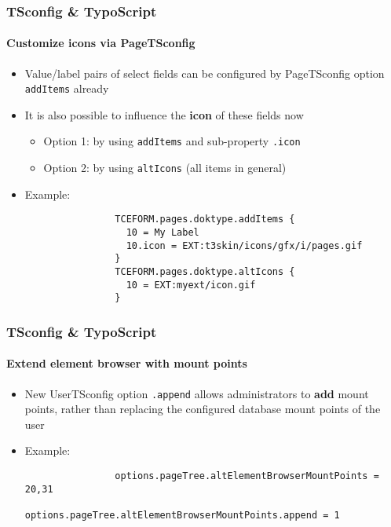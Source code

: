 \begin{frame}[fragile]
	\frametitle{TSconfig \& TypoScript}
	\framesubtitle{Customize icons via PageTSconfig}

	\begin{itemize}
		\item Value/label pairs of select fields can be configured by PageTSconfig option \texttt{addItems} already
		\item It is also possible to influence the \textbf{icon} of these fields now

			\begin{itemize}
				\item Option 1: by using \texttt{addItems} and sub-property \texttt{.icon}
				\item Option 2: by using \texttt{altIcons} (all items in general)
			\end{itemize}

		\item Example:

			\begin{lstlisting}
				TCEFORM.pages.doktype.addItems {
				  10 = My Label
				  10.icon = EXT:t3skin/icons/gfx/i/pages.gif
				}
				TCEFORM.pages.doktype.altIcons {
				  10 = EXT:myext/icon.gif
				}
			\end{lstlisting}

	\end{itemize}

\end{frame}


\begin{frame}[fragile]
	\frametitle{TSconfig \& TypoScript}
	\framesubtitle{Extend element browser with mount points}

	\begin{itemize}
		\item New UserTSconfig option \texttt{.append} allows administrators to \textbf{add}
			mount points, rather than replacing the configured database mount points of the user 

		\item Example:

			\begin{lstlisting}
				options.pageTree.altElementBrowserMountPoints = 20,31
				options.pageTree.altElementBrowserMountPoints.append = 1
			\end{lstlisting}

	\end{itemize}

\end{frame}

